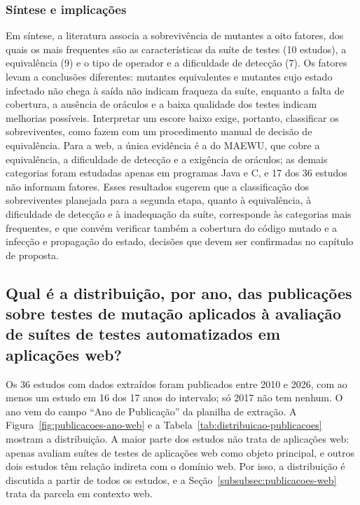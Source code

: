 \subsubsection{Síntese e implicações}
\label{subsubsec:sintese-fatores}

Em síntese, a literatura associa a sobrevivência de mutantes a oito fatores, dos quais os mais frequentes são as características da suíte de testes (10 estudos), a equivalência (9) e o tipo de operador e a dificuldade de detecção (7). Os fatores levam a conclusões diferentes: mutantes equivalentes e mutantes cujo estado infectado não chega à saída não indicam fraqueza da suíte, enquanto a falta de cobertura, a ausência de oráculos e a baixa qualidade dos testes indicam melhorias possíveis. Interpretar um escore baixo exige, portanto, classificar os sobreviventes, como fazem  com um procedimento manual de decisão de equivalência. Para a web, a única evidência é a do MAEWU, que cobre a equivalência, a dificuldade de detecção e a exigência de oráculos; as demais categorias foram estudadas apenas em programas Java e C, e 17 dos 36 estudos não informam fatores. Esses resultados sugerem que a classificação dos sobreviventes planejada para a segunda etapa, quanto à equivalência, à dificuldade de detecção e à inadequação da suíte, corresponde às categorias mais frequentes, e que convém verificar também a cobertura do código mutado e a infecção e propagação do estado, decisões que devem ser confirmadas no capítulo de proposta.

\subsection[Distribuição por ano sobre testes de mutação]{Qual é a distribuição, por ano, das publicações sobre testes de mutação aplicados à avaliação de suítes de testes automatizados em aplicações web?}
\label{subsec:distribucao-ano}

Os 36 estudos com dados extraídos foram publicados entre 2010 e 2026, com ao menos um estudo em 16 dos 17 anos do intervalo; só 2017 não tem nenhum. O ano vem do campo ``Ano de Publicação'' da planilha de extração. A Figura~\ref{fig:publicacoes-ano-web} e a Tabela~\ref{tab:distribuicao-publicacoes} mostram a distribuição. A maior parte dos estudos não trata de aplicações web: apenas  avaliam suítes de testes de aplicações web como objeto principal, e outros dois estudos têm relação indireta com o domínio web. Por isso, a distribuição é discutida a partir de todos os estudos, e a Seção~\ref{subsubsec:publicacoes-web} trata da parcela em contexto web.

